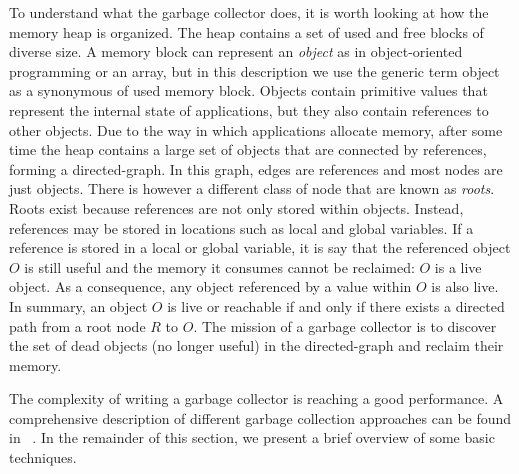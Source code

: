 To understand what the garbage collector does, it is worth looking at how the memory heap is organized.
The heap contains a set of used and free blocks of diverse size.
A memory block can represent an \textit{object} as in object-oriented programming or an array, but in this description we use the generic term object as a synonymous of used memory block. 
Objects contain primitive values that represent the internal state of applications, but they also contain references to other objects.
Due to the way in which applications allocate memory, after some time the heap contains a large set of objects that are connected by references, forming a directed-graph.
In this graph, edges are references and most nodes are just objects.
There is however a different class of node that are known as \textit{roots}.
Roots exist because references are not only stored within objects.
Instead, references may be stored in locations such as local and global variables.
If a reference is stored in a local or global variable, it is say that the referenced object $O$ is still useful and the memory it consumes cannot be reclaimed: $O$ is a live object.
As a consequence, any object referenced by a value within $O$ is also live.
In summary, an object $O$ is live or reachable if and only if there exists a directed path from a root node $R$ to $O$.
The mission of a garbage collector is to discover the set of dead objects (no longer useful) in the directed-graph and reclaim their memory.

The complexity of writing a garbage collector is reaching a good performance.
A comprehensive description of different garbage collection approaches can be found in ~\cite{Richard2012}.
In the remainder of this section, we present a brief overview of some basic techniques.

